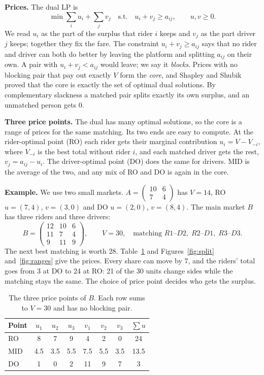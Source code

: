 \documentclass[11pt,a4paper]{article}
\begin{document}
\textbf{Prices.} The dual LP is
\[
\min \sum_i u_i+\sum_j v_j
\quad\text{s.t.}\quad
u_i+v_j\ge a_{ij},\qquad u,v\ge 0 .
\]
We read $u_i$ as the part of the surplus that rider $i$ keeps and $v_j$ as the part driver $j$ keeps; together they fix the fare. The constraint $u_i+v_j\ge a_{ij}$ says that no rider and driver can both do better by leaving the platform and splitting $a_{ij}$ on their own. A pair with $u_i+v_j<a_{ij}$ would leave; we say it \emph{blocks}. Prices with no blocking pair that pay out exactly $V$ form the \emph{core}, and Shapley and Shubik~\cite{shapley} proved that the core is exactly the set of optimal dual solutions. By complementary slackness a matched pair splits exactly its own surplus, and an unmatched person gets 0.

\textbf{Three price points.} The dual has many optimal solutions, so the core is a range of prices for the same matching. Its two ends are easy to compute. At the rider-optimal point (RO) each rider gets their marginal contribution $u_i=V-V_{-i}$, where $V_{-i}$ is the best total without rider $i$, and each matched driver gets the rest, $v_j=a_{ij}-u_i$. The driver-optimal point (DO) does the same for drivers. MID is the average of the two, and any mix of RO and DO is again in the core.

\textbf{Example.} We use two small markets. $A=\begin{pmatrix}10&6\\7&4\end{pmatrix}$ has $V=14$, RO $u=(7,4)$, $v=(3,0)$ and DO $u=(2,0)$, $v=(8,4)$. The main market $B$ has three riders and three drivers:
\[
B=\begin{pmatrix}12&10&6\\11&7&4\\9&11&9\end{pmatrix},\qquad V=30,\quad \text{matching } R1\text{--}D2,\; R2\text{--}D1,\; R3\text{--}D3 .
\]
The next best matching is worth 28. Table~\ref{tab:core} and Figures~\ref{fig:split} and~\ref{fig:ranges} give the prices. Every share can move by 7, and the riders' total goes from 3 at DO to 24 at RO: 21 of the 30 units change sides while the matching stays the same. The choice of price point decides who gets the surplus.

\begin{table}[h]
\centering\small
\begin{tabular}{lccccccc}
\toprule
Point & $u_1$ & $u_2$ & $u_3$ & $v_1$ & $v_2$ & $v_3$ & $\sum u$ \\
\midrule
RO  & 8   & 7   & 9   & 4   & 2   & 0   & 24 \\
MID & 4.5 & 3.5 & 5.5 & 7.5 & 5.5 & 3.5 & 13.5 \\
DO  & 1   & 0   & 2   & 11  & 9   & 7   & 3 \\
\bottomrule
\end{tabular}
\caption{The three price points of $B$. Each row sums to $V=30$ and has no blocking pair.}
\label{tab:core}
\end{table}
\end{document}
